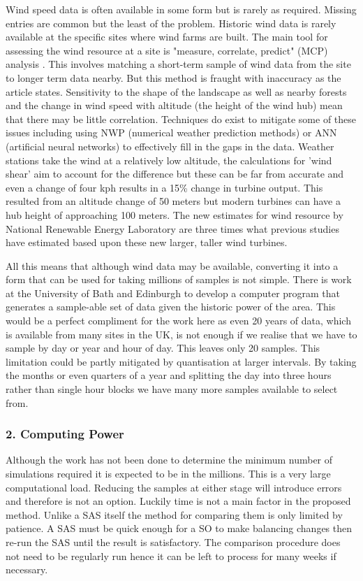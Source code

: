 \documentclass[a4paper,oneside,12pt]{report}
\begin{document}
Wind speed data is often available in some form but is rarely as required. Missing entries are common but the least of the problem. Historic wind data is rarely available at the specific sites where wind farms are built. The main tool for assessing the wind resource at a site is "measure, correlate, predict" (MCP) analysis \cite{Economist2010}. This involves matching a short-term sample of wind data from the site to longer term data nearby. But this method is fraught with inaccuracy as the article states. Sensitivity to the shape of the landscape as well as nearby forests and the change in wind speed with altitude (the height of the wind hub) mean that there may be little correlation. Techniques do exist to mitigate some of these issues including using NWP (numerical weather prediction methods) or ANN (artificial neural networks) to effectively fill in the gaps in the data. Weather stations take the wind at a relatively low altitude, the calculations for 'wind shear' aim to account for the difference but these can be far from accurate and even a change of four kph results in a 15\% change in turbine output. This resulted from an altitude change of 50 meters but modern turbines can have a hub height of approaching 100 meters. The new estimates for wind resource by National Renewable Energy Laboratory \cite{NationalRenewableEnergyLaboratory2010} are three times what previous studies have estimated based upon these new larger, taller wind turbines.

All this means that although wind data may be available, converting it into a form that can be used for taking millions of samples is not simple. There is work at the University of Bath and Edinburgh to develop a computer program that generates a sample-able set of data given the historic power of the area. This would be a perfect compliment for the work here as even 20 years of data, which is available from many sites in the UK, is not enough if we realise that we have to sample by day or year and hour of day. This leaves only 20 samples. This limitation could be partly mitigated by quantisation at larger intervals. By taking the months or even quarters of a year and splitting the day into three hours rather than single hour blocks we have many more samples available to select from.

\subsubsection{2. Computing Power}

Although the work has not been done to determine the minimum number of simulations required it is expected to be in the millions. This is a very large computational load. Reducing the samples at either stage will introduce errors and therefore is not an option. Luckily time is not a main factor in the proposed method. Unlike a SAS itself the method for comparing them is only limited by patience. A SAS must be quick enough for a SO to make balancing changes then re-run the SAS until the result is satisfactory. The comparison procedure does not need to be regularly run hence it can be left to process for many weeks if necessary.
\end{document}
